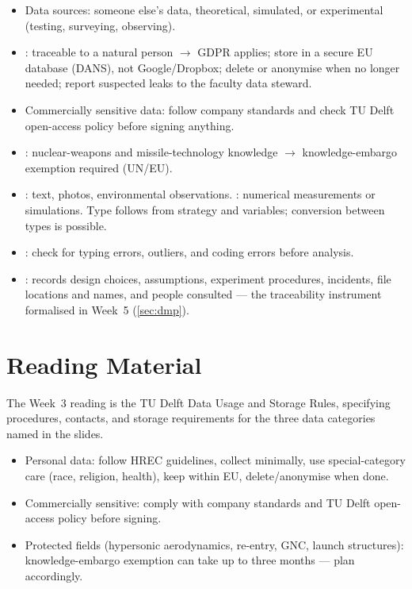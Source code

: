 \documentclass[../main.tex]{subfiles}
\begin{document}
\begin{itemize}
  \item Data sources: someone else's data, theoretical, simulated, or experimental (testing, surveying, observing).
  \item {}: traceable to a natural person $\to$ GDPR applies; store in a secure EU database (DANS), not Google/Dropbox; delete or anonymise when no longer needed; report suspected leaks to the faculty data steward.
  \item Commercially sensitive data: follow company standards and check TU Delft open-access policy before signing anything.
  \item {}: nuclear-weapons and missile-technology knowledge $\to$ knowledge-embargo exemption required (UN/EU).
  \item {}: text, photos, environmental observations. : numerical measurements or simulations. Type follows from strategy and variables; conversion between types is possible.
  \item {}: check for typing errors, outliers, and coding errors before analysis.
  \item {}: records design choices, assumptions, experiment procedures, incidents, file locations and names, and people consulted — the traceability instrument formalised in Week~5 (\autoref{sec:dmp}).
\end{itemize}

\section{Reading Material}
\label{sec:reading3}

\begin{partbox}
The Week~3 reading is the TU Delft Data Usage and Storage Rules, specifying procedures, contacts, and storage requirements for the three data categories named in the slides.
\end{partbox}

\begin{itemize}
  \item Personal data: follow HREC guidelines, collect minimally, use special-category care (race, religion, health), keep within EU, delete/anonymise when done.
  \item Commercially sensitive: comply with company standards and TU Delft open-access policy before signing.
  \item Protected fields (hypersonic aerodynamics, re-entry, GNC, launch structures): knowledge-embargo exemption can take up to three months — plan accordingly.
\end{itemize}
\end{document}
